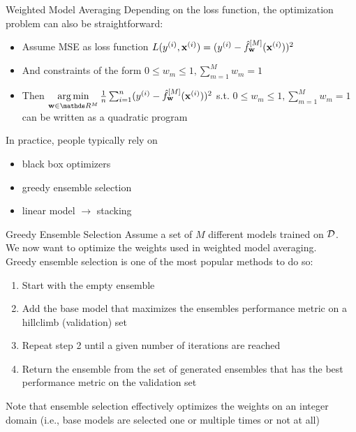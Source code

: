 \documentclass[11pt,compress,t,notes=noshow, aspectratio=169, xcolor=table]{beamer}
\begin{document}

\begin{vbframe}{Weighted Model Averaging}
Depending on the loss function, the optimization problem can also be straightforward:
\begin{itemize}
    \item Assume MSE as loss function $L(y^{(i)}, \mathbf{x}^{(i)}) = (y^{(i)} - \hat{f}_{\mathbf{w}}^{[M]}(\mathbf{x}^{(i)}))^{2}$
    \item And constraints of the form $0 \le w_{m} \le 1, \sum_{m=1}^{M} w_{m} = 1$
    \item Then $\argminlim_{\mathbf{w} \in \R^{M}} \frac{1}{n} \sum_{i = 1}^{n} (y^{(i)} - \fMwxi)^{2}$ s.t. $0 \le w_{m} \le 1, \sum_{m=1}^{M} w_{m} = 1$ can be written as a quadratic program
\end{itemize}
\vspace{1em}
In practice, people typically rely on  
\begin{itemize}
    \item black box optimizers
    \item greedy ensemble selection
    \item linear model $\rightarrow$ stacking
\end{itemize}
\end{vbframe}



\begin{vbframe}{Greedy Ensemble Selection}
Assume a set of $M$ different models trained on $\mathcal{D}$.\\
We now want to optimize the weights used in weighted model averaging.\\
\vspace{1em}
Greedy ensemble selection is one of the most popular methods to do so:
\begin{enumerate}
    \item Start with the empty ensemble
    \item Add the base model that maximizes the ensembles performance metric on a hillclimb (validation) set
    \item Repeat step 2 until a given number of iterations are reached
    \item Return the ensemble from the set of generated ensembles that has the best performance metric on the validation set
\end{enumerate}
\vspace{1em}
Note that ensemble selection effectively optimizes the weights on an integer domain (i.e., base models are selected one or multiple times or not at all)
\end{vbframe}
\end{document}
